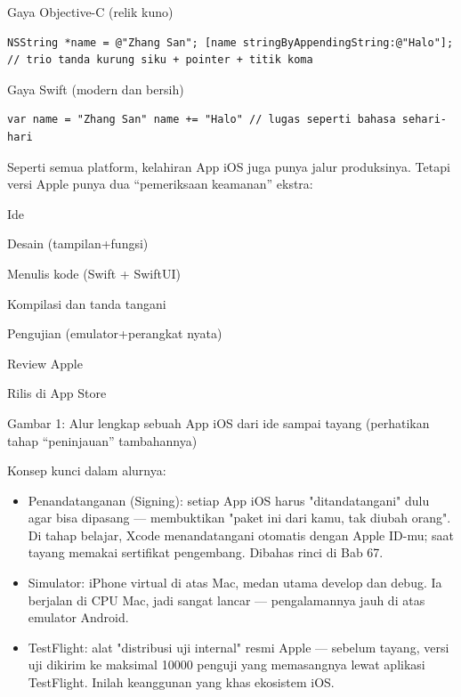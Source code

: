 Gaya Objective-C (relik kuno)

\begin{lstlisting}
NSString *name = @"Zhang San"; [name stringByAppendingString:@"Halo"]; // trio tanda kurung siku + pointer + titik koma
\end{lstlisting}

Gaya Swift (modern dan bersih)

\begin{lstlisting}
var name = "Zhang San" name += "Halo" // lugas seperti bahasa sehari-hari
\end{lstlisting}


Seperti semua platform, kelahiran App iOS juga punya jalur produksinya. Tetapi versi Apple punya dua “pemeriksaan keamanan” ekstra:

Ide

Desain (tampilan+fungsi)

Menulis kode (Swift + SwiftUI)

Kompilasi dan tanda tangani

Pengujian (emulator+perangkat nyata)

Review Apple

Rilis di App Store

\begin{center}\small\color{gray}Gambar 1: Alur lengkap sebuah App iOS dari ide sampai tayang (perhatikan tahap “peninjauan” tambahannya)\end{center}

Konsep kunci dalam alurnya:

\begin{itemize}
  \item Penandatanganan (Signing): setiap App iOS harus "ditandatangani" dulu agar bisa dipasang — membuktikan "paket ini dari kamu, tak diubah orang". Di tahap belajar, Xcode menandatangani otomatis dengan Apple ID-mu; saat tayang memakai sertifikat pengembang. Dibahas rinci di Bab 67.
  \item Simulator: iPhone virtual di atas Mac, medan utama develop dan debug. Ia berjalan di CPU Mac, jadi sangat lancar — pengalamannya jauh di atas emulator Android.
  \item TestFlight: alat "distribusi uji internal" resmi Apple — sebelum tayang, versi uji dikirim ke maksimal 10000 penguji yang memasangnya lewat aplikasi TestFlight. Inilah keanggunan yang khas ekosistem iOS.
\end{itemize}

